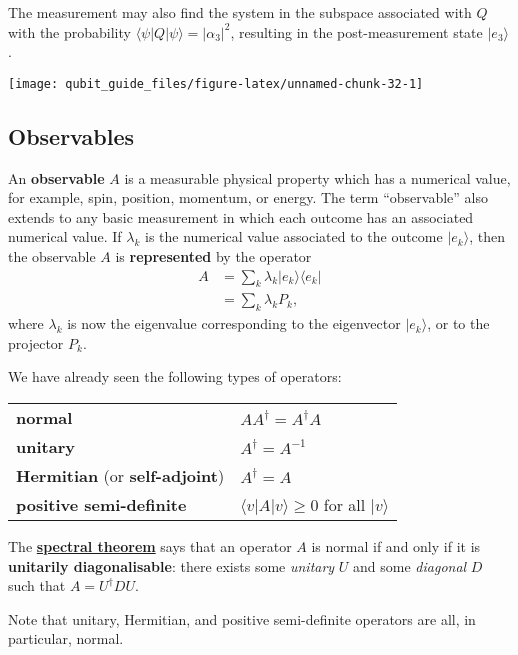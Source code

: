 \documentclass[fleqn]{article}
\newenvironment{idea}{\noindent}{\medskip}
\begin{document}
The measurement may also find the system in the subspace associated with \(Q\) with the probability \(\langle\psi|Q|\psi\rangle = |\alpha_3|^2\), resulting in the post-measurement state \(|e_3\rangle\).

\begin{center}\texttt{[image: qubit\_guide\_files/figure-latex/unnamed-chunk-32-1]} \end{center}

\hypertarget{observables}{%
\subsection{Observables}\label{observables}}

An \textbf{observable} \(A\) is a measurable physical property which has a numerical value, for example, spin, position, momentum, or energy.
The term ``observable'' also extends to any basic measurement in which each outcome has an associated numerical value.
If \(\lambda_k\) is the numerical value associated to the outcome \(|e_k\rangle\), then the observable \(A\) is \textbf{represented} by the operator
\[
  \begin{aligned}
    A
    &= \sum_k \lambda_k |e_k\rangle\langle e_k|
  \\&= \sum_k \lambda_k P_k,
  \end{aligned}
\]
where \(\lambda_k\) is now the eigenvalue corresponding to the eigenvector \(|e_k\rangle\), or to the projector \(P_k\).

\begin{idea}
We have already seen the following types of operators:

\begin{longtable}[]{@{}
  >{\raggedright\arraybackslash}p{}
  >{\raggedright\arraybackslash}p{}@{}}
\toprule()
\endhead
\textbf{normal} & \(AA^\dagger = A^\dagger A\) \\
\textbf{unitary} & \(A^\dagger = A^{-1}\) \\
\textbf{Hermitian} (or \textbf{self-adjoint}) & \(A^\dagger = A\) \\
\textbf{positive semi-definite} & \(\langle v|A|v\rangle\geqslant 0\) for all \(|v\rangle\) \\
\bottomrule()
\end{longtable}

The \href{https://en.wikipedia.org/wiki/Spectral_theorem}{\textbf{spectral theorem}} says that an operator \(A\) is normal if and only if it is \textbf{unitarily diagonalisable}: there exists some \emph{unitary} \(U\) and some \emph{diagonal} \(D\) such that \(A=U^\dagger DU\).

Note that unitary, Hermitian, and positive semi-definite operators are all, in particular, normal.

\end{idea}
\end{document}
